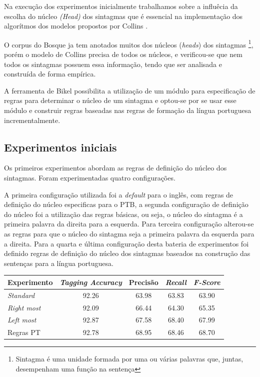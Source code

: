 
Na execução dos experimentos inicialmente trabalhamos sobre a influêcia da escolha do núcleo \emph{(Head)} dos sintagmas que é essencial na implementação dos algorítmos dos modelos propostos por Collins \cite{collins99}.

O corpus do Bosque ja tem anotados muitos dos núcleos (\emph{heads}) dos sintagmas \footnote{Sintagma é uma unidade formada por uma ou várias palavras que, juntas, desempenham uma função na sentença}, porém o modelo de Collins precisa de todos os núcleos, e verificou-se que nem todos os sintagmas possuem essa informação, tendo que ser analisada e construída de forma empírica.

A ferramenta de Bikel possibilita a utilização de um módulo para especificação de regras para determinar o núcleo de um sintagma e optou-se por se usar esse módulo e construir regras baseadas nas regras de formação da língua portuguesa incrementalmente.

\subsection{Experimentos iniciais}
\label{sec:configuracoes}

Os primeiros experimentos abordam as regras de definição do núcleo dos sintagmas. Foram experimentadas quatro configurações.

A primeira configuração utilizada foi a \emph{default} para o inglês, com regras de definição do núcleo especificas para o PTB, a segunda configuração de definição do núcleo foi a utilização das regras básicas, ou seja, o núcleo do sintagma é a primeira palavra da direita para a esquerda. Para terceira configuração alterou-se as regras para que o núcleo do sintagma seja a primeira palavra da esquerda para a direita. Para a quarta e última configuração desta bateria de experimentos foi definido regras de definição do núcleo dos sintagmas baseados na construção das sentenças para a língua portuguesa.


\begin{center}
   \footnotesize
	\begin{tabular}{|l|c|c|c|c|}
		\hline
		\textbf{Experimento} &  \textbf{\emph{Tagging Accuracy}} & \textbf{Precisão} & \textbf{\emph{Recall}} & \textbf{\emph{F-Score}} \\
		\hline
		\emph{Standard} & 92.26 & 63.98 & 63.83 & 63.90\\
		\hline		
		\emph{Right most} & 92.09 & 66.44 & 64.30 & 65.35\\
		\hline		
		\emph{Left most} & 92.87 & 67.58 & 68.40 & 67.99\\
		\hline		
		Regras PT & 92.78 & 68.95 & 68.46 & 68.70\\
		\hline
	\end{tabular}
	\label{tab:primeiro_experimento}
\end{center}


